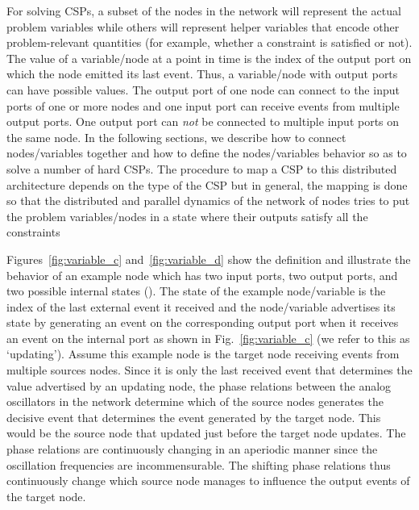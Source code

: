 \documentclass[10pt]{article}
\begin{document}
For solving CSPs, a subset of the nodes in the network will represent the actual problem variables while others will represent helper variables that encode other problem-relevant quantities (for example, whether a constraint is satisfied or not). The value of a variable/node at a point in time is the index of the output port on which the node emitted its last event. Thus, a variable/node with  output ports can have  possible values. The output port of one node can connect to the input ports of one or more nodes and one input port can receive events from multiple output ports. One output port can {\it not} be connected to multiple input ports on the same node. In the following sections, we describe how to connect nodes/variables together and how to define the nodes/variables behavior so as to solve a number of hard CSPs. The procedure to map a CSP to this distributed architecture depends on the type of the CSP but in general, the mapping is done so that the distributed and parallel dynamics of the network of nodes tries to put the problem variables/nodes in a state where their outputs satisfy all the constraints





Figures~\ref{fig:variable_c} and~\ref{fig:variable_d} show the definition and illustrate the behavior of an example node which has two input ports, two output ports, and two possible internal states (). The state of the example node/variable is the index of the last external event it received and the node/variable advertises its state by generating an event on the corresponding output port when it receives an event on the internal port  as shown in Fig.~\ref{fig:variable_c} (we refer to this as `updating'). Assume this example node is the target node receiving events from multiple sources nodes. Since it is only the last received event that determines the value advertised by an updating node, the phase relations between the analog oscillators in the network determine which of the source nodes generates the decisive event that determines the event generated by the target node. This would be the source node that updated just before the target node updates. The phase relations are continuously changing in an aperiodic manner since the oscillation frequencies are incommensurable. The shifting phase relations thus continuously change which source node manages to influence the output events of the target node.
\end{document}
